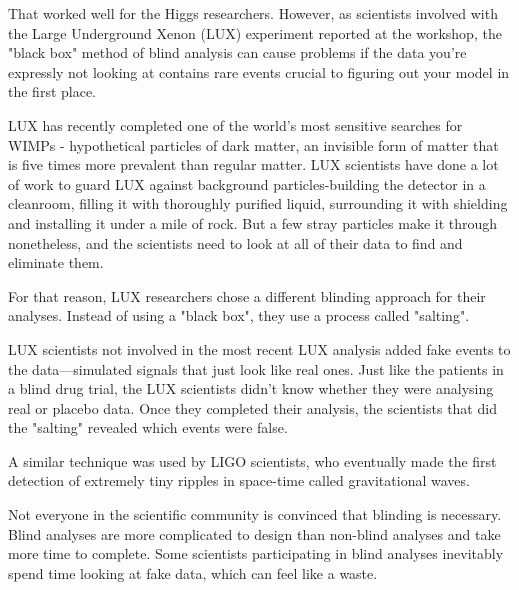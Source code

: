 	That worked well for the Higgs researchers. However, as scientists involved with the Large Underground Xenon (LUX) experiment reported at the workshop, the "black box" method of blind analysis can cause problems if the data you're expressly not looking at contains rare events crucial to figuring out your model in the first place.
	
	LUX has recently completed one of the world's most sensitive searches for WIMPs - hypothetical particles of dark matter, an invisible form of matter that is five times more prevalent than regular matter. LUX scientists have done a lot of work to guard LUX against background particles-building the detector in a cleanroom, filling it with thoroughly purified liquid, surrounding it with shielding and installing it under a mile of rock. But a few stray particles make it through nonetheless, and the scientists need to look at all of their data to find and eliminate them.

	For that reason, LUX researchers chose a different blinding approach for their analyses. Instead of using a "black box", they use a process called "salting".

	LUX scientists not involved in the most recent LUX analysis added fake events to the data—simulated signals that just look like real ones. Just like the patients in a blind drug trial, the LUX scientists didn't know whether they were analysing real or placebo data. Once they completed their analysis, the scientists that did the "salting" revealed which events were false.

	A similar technique was used by LIGO scientists, who eventually made the first detection of extremely tiny ripples in space-time called gravitational waves.

	Not everyone in the scientific community is convinced that blinding is necessary. Blind analyses are more complicated to design than non-blind analyses and take more time to complete. Some scientists participating in blind analyses inevitably spend time looking at fake data, which can feel like a waste.
	
